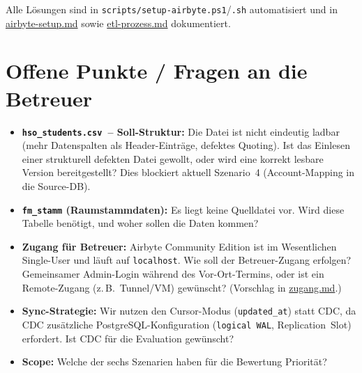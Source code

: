 \documentclass[a4paper,12pt]{article}
\begin{document}
Alle Lösungen sind in \texttt{scripts/setup-airbyte.ps1}/\texttt{.sh} automatisiert
und in
\href{https://github.com/Timbo3399/INFM_Airbyte/blob/main/docs/airbyte-setup.md}{airbyte-setup.md}
sowie
\href{https://github.com/Timbo3399/INFM_Airbyte/blob/main/docs/etl-prozess.md}{etl-prozess.md}
dokumentiert.
 
\section{Offene Punkte / Fragen an die Betreuer}
\label{sec:offene-punkte}
 
\begin{itemize}[leftmargin=*, itemsep=0.6em]
    \item \textbf{\texttt{hso\_students.csv}~-- Soll-Struktur:}
          Die Datei ist nicht eindeutig ladbar (mehr Datenspalten als Header-Einträge,
          defektes Quoting). Ist das Einlesen einer strukturell defekten Datei
          gewollt, oder wird eine korrekt lesbare Version bereitgestellt?
          Dies blockiert aktuell Szenario~4 (Account-Mapping in die Source-DB).
 
    \item \textbf{\texttt{fm\_stamm} (Raumstammdaten):}
          \label{sec:fm-stamm}
          Es liegt keine Quelldatei vor. Wird diese Tabelle benötigt, und woher
          sollen die Daten kommen?
 
    \item \textbf{Zugang für Betreuer:}
          Airbyte Community Edition ist im Wesentlichen Single-User und läuft auf
          \texttt{localhost}. Wie soll der Betreuer-Zugang erfolgen?
          Gemeinsamer Admin-Login während des Vor-Ort-Termins, oder ist ein
          Remote-Zugang (z.\,B.\ Tunnel/VM) gewünscht?
          (Vorschlag in
          \href{https://github.com/Timbo3399/INFM_Airbyte/blob/main/docs/zugang.md}{zugang.md}.)
 
    \item \textbf{Sync-Strategie:}
          Wir nutzen den Cursor-Modus (\texttt{updated\_at}) statt CDC, da CDC
          zusätzliche PostgreSQL-Konfiguration (\texttt{logical WAL},
          Replication~Slot) erfordert. Ist CDC für die Evaluation gewünscht?
 
    \item \textbf{Scope:}
          Welche der sechs Szenarien haben für die Bewertung Priorität?
\end{itemize}
 
\end{document}
